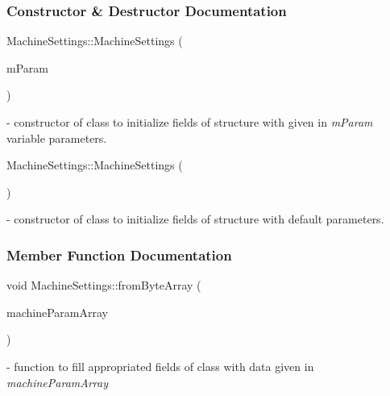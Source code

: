 \subsubsection{Constructor \& Destructor Documentation}
\mbox{\label{classMachineSettings_ab1b5f2057a07bb5bf20931cd9d5afb25}} 
{\footnotesize\ttfamily Machine\+Settings\+::\texorpdfstring{Machine\+Settings}{MachineSettings}{\footnotesize\ttfamily [1/2]} (\begin{DoxyParamCaption}\item[{\mbox{\hyperlink{classMachineSettings_a87879e13793dbc7c10d4fa18e1236751}{Machine\+Settings\+::\+Machine\+Parameters}}}]{m\+Param }\end{DoxyParamCaption})} - constructor of class to initialize fields of structure with given in \textit{mParam} variable parameters. 

\mbox{\label{classMachineSettings_a6ecb0fe6e75f5c33941cb08d467e834f}} 
{\footnotesize\ttfamily Machine\+Settings\+::\texorpdfstring{Machine\+Settings}{MachineSettings}{\footnotesize\ttfamily [2/2]} (\begin{DoxyParamCaption}{ }\end{DoxyParamCaption})} - constructor of class to initialize fields of structure with default parameters.

\subsubsection{Member Function Documentation}
\mbox{\label{classMachineSettings_ac28b9c28855fe22c85e95379eea9c252}} 
{\footnotesize\ttfamily void Machine\+Settings\+::\texorpdfstring{from\+Byte\+Array}{fromByteArray} (\begin{DoxyParamCaption}\item[{Q\+Byte\+Array}]{machine\+Param\+Array }\end{DoxyParamCaption})} - function to fill appropriated fields of class with data given in \textit{machine\+Param\+Array}

